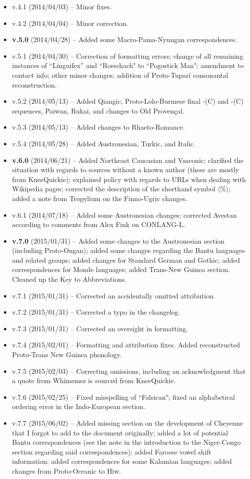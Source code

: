 \begin{itemize}
\item v.4.1 (2014/04/03) -- Minor fixes.
\item v.4.2 (2014/04/04) -- Minor correction.
\item \textbf{v.5.0} (2014/04/28) -- Added some Macro-Pama-Nyungan correspondences.
\item v.5.1 (2014/04/30) -- Correction of formatting errors; change of all remaining instances of ``Linguifex'' and ``Rorschach" to ``Pogostick Man"; amendment to contact info; other minor changes; addition of Proto-Tupar\'{i} consonantal reconstruction.
\item v.5.2 (2014/05/13) -- Added Qiangic, Proto-Lolo-Burmese final -(C) and -(C) sequences, Paiwan, Rukai, and changes to Old Proven\c{c}al.
\item v.5.3 (2014/05/13) -- Added changes to Rhaeto-Romance.
\item v.5.4 (2014/05/28) -- Added Austronesian, Turkic, and Italic.
\item {\bf v.6.0} (2014/06/21) -- Added Northeast Caucasian and Vasconic; clarified the situation with regards to sources without a known author (these are mostly from KneeQuickie); explained policy with regards to URLs when dealing with Wikipedia pages; corrected the description of the shorthand symbol $\langle$\%$\rangle$; added a note from Tropylium on the Finno-Ugric changes.
\item v.6.1 (2014/07/18) -- Added some Austronesian changes; corrected Avestan according to comments from Alex Fink on CONLANG-L.
\item \textbf{v.7.0} (2015/01/31) -- Added some changes to the Austronesian section (including Proto-Ongan); added some changes regarding the Bantu languages and related groups; added changes for Standard German and Gothic; added correspondences for Monde languages; added Trans-New Guinea section. Cleaned up the Key to Abbreviations.
\item v.7.1 (2015/01/31) -- Corrected an accidentally omitted attribution.
\item v.7.2 (2015/01/31) -- Corrected a typo in the changelog.
\item v.7.3 (2015/01/31) -- Corrected an oversight in formatting.
\item v.7.4 (2015/02/01) -- Formatting and attribution fixes. Added reconstructed Proto-Trans New Guinea phonology.
\item v.7.5 (2015/02/03) -- Correcting omissions, including an acknowledgment that a quote from Whimemsz is sourced from KneeQuickie.
\item v.7.6 (2015/02/25) -- Fixed misspelling of ``Falsican"; fixed an alphabetical ordering 
error in the Indo-European section.
\item v.7.7 (2015/06/02) -- Added missing section on the development of Cheyenne that I forgot to add to the document originally; added a lot of potential Bantu correspondences (see the note in the introduction to the Niger-Congo section regarding said correspondences); added Faroese vowel shift information; added correspondences for some Kalamian languages; added changes from Proto-Oceanic to Hiw.
\end{itemize}
\clearpage

